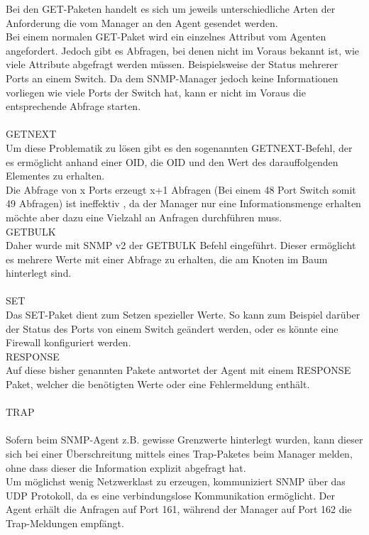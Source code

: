 Bei den GET-Paketen handelt es sich um jeweils unterschiedliche Arten der Anforderung die vom Manager an den Agent gesendet werden.\\
Bei einem normalen GET-Paket wird ein einzelnes Attribut vom Agenten angefordert. Jedoch gibt es Abfragen, bei denen nicht im Voraus bekannt ist, wie viele Attribute abgefragt werden müssen. Beispielsweise der Status mehrerer Ports an einem Switch. Da dem SNMP-Manager jedoch keine Informationen vorliegen wie viele Ports der Switch hat, kann er nicht im Voraus die entsprechende Abfrage starten.\\
\\
GETNEXT\\

Um diese Problematik zu lösen gibt es den sogenannten GETNEXT-Befehl, der es ermöglicht anhand einer OID, die OID und den Wert des darauffolgenden Elementes zu erhalten.\\

Die Abfrage von x Ports erzeugt x+1 Abfragen (Bei einem 48 Port Switch somit 49 Abfragen) ist ineffektiv , da der Manager nur eine Informationsmenge erhalten möchte aber dazu eine Vielzahl an Anfragen durchführen muss.
\\
GETBULK\\

Daher wurde mit SNMP v2 der GETBULK Befehl eingeführt. Dieser ermöglicht es mehrere Werte mit einer Abfrage zu erhalten, die am Knoten im Baum hinterlegt sind.\\
\\
SET\\

Das SET-Paket dient zum Setzen spezieller Werte.
So kann zum Beispiel darüber der Status des Ports von einem Switch  geändert werden, oder es könnte eine Firewall konfiguriert werden.
\\
RESPONSE\\
Auf diese bisher genannten Pakete antwortet der Agent mit einem RESPONSE Paket, welcher die benötigten Werte oder eine Fehlermeldung enthält.\\
\\
TRAP\\
\\
Sofern beim SNMP-Agent z.B. gewisse Grenzwerte hinterlegt wurden, kann dieser sich bei einer Überschreitung mittels eines Trap-Paketes beim Manager melden, ohne dass dieser die Information explizit abgefragt hat.\\
Um möglichst wenig Netzwerklast zu erzeugen, kommuniziert SNMP über das UDP Protokoll, da es eine verbindungslose Kommunikation ermöglicht.
Der Agent erhält die Anfragen auf Port 161, während der Manager auf Port 162 die Trap-Meldungen empfängt.\\





